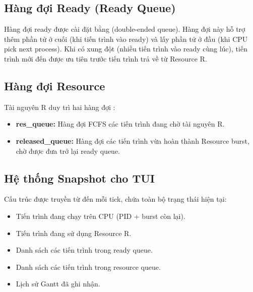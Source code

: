 \subsection{Hàng đợi Ready (Ready Queue)}

Hàng đợi ready được cài đặt bằng  (double-ended queue). Hàng đợi này hỗ trợ thêm phần tử ở cuối (khi tiến trình vào ready) và lấy phần tử ở đầu (khi CPU pick next process). Khi có xung đột (nhiều tiến trình vào ready cùng lúc), tiến trình mới đến được ưu tiên trước tiến trình trả về từ Resource R.

\subsection{Hàng đợi Resource}

Tài nguyên R duy trì hai hàng đợi :
\begin{itemize}
    \item \textbf{res\_queue:} Hàng đợi FCFS các tiến trình đang chờ tài nguyên R.
    \item \textbf{released\_queue:} Hàng đợi các tiến trình vừa hoàn thành Resource burst, chờ được đưa trở lại ready queue.
\end{itemize}

\subsection{Hệ thống Snapshot cho TUI}

Cấu trúc  được truyền từ  đến  mỗi tick, chứa toàn bộ trạng thái hiện tại:
\begin{itemize}
    \item Tiến trình đang chạy trên CPU (PID + burst còn lại).
    \item Tiến trình đang sử dụng Resource R.
    \item Danh sách các tiến trình trong ready queue.
    \item Danh sách các tiến trình trong resource queue.
    \item Lịch sử Gantt đã ghi nhận.
\end{itemize}
